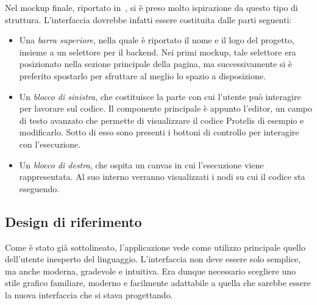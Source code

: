       Nel mockup finale, riportato in~, si è preso molto ispirazione da questo tipo di struttura.
      L'interfaccia dovrebbe infatti essere costituita dalle parti seguenti:

      \begin{itemize}
        \item
          Una \emph{barra superiore}, nella quale è riportato il nome e il logo del progetto, insieme a un selettore per il backend.
          Nei primi mockup, tale selettore era posizionato nella sezione principale della pagina, ma successivamente si è preferito spostarlo per sfruttare al meglio lo spazio a disposizione.
        \item
          Un \emph{blocco di sinistra}, che costituisce la parte con cui l'utente può interagire per lavorare sul codice.
          Il componente principale è appunto l'editor, un campo di testo avanzato che permette di visualizzare il codice Protelis di esempio e modificarlo.
          Sotto di esso sono presenti i bottoni di controllo per interagire con l'esecuzione.
        \item
          Un \emph{blocco di destra}, che ospita un canvas in cui l'esecuzione viene rappresentata.
          Al suo interno verranno visualizzati i nodi su cui il codice sta eseguendo.
      \end{itemize}

    \subsection{Design di riferimento}\label{subsec:material}
      Come è stato già sottolineato, l'applicazione vede come utilizzo principale quello dell'utente inesperto del linguaggio.
      L'interfaccia non deve essere solo semplice, ma anche moderna, gradevole e intuitiva.
      Era dunque necessario scegliere uno stile grafico familiare, moderno e facilmente adattabile a quella che sarebbe essere la nuova interfaccia che si stava progettando.

